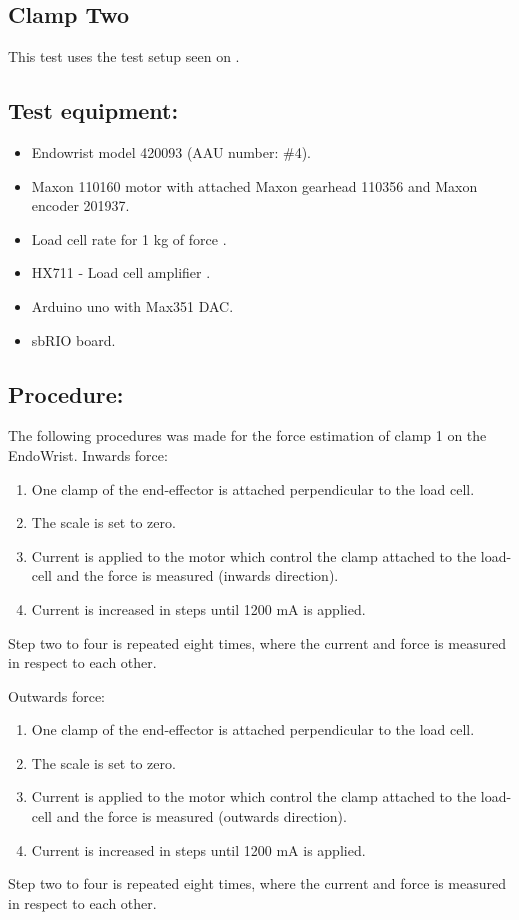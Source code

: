 \subsection{Clamp Two} %
This test uses the test setup seen on .

\subsection*{Test equipment:}
\begin{itemize}
\item Endowrist model 420093 (AAU number: \#4).
\item Maxon 110160 motor with attached Maxon gearhead 110356 and Maxon encoder 201937.
\item Load cell rate for 1 kg of force \cite{Load_cell_1kg}.
\item HX711 - Load cell amplifier \cite{HX711}.
\item Arduino uno with Max351 DAC.
\item sbRIO board.
\end{itemize}

\subsection*{Procedure:}
The following procedures was made for the force estimation of clamp 1 on the EndoWrist. 
Inwards force:
\begin{enumerate}
\item One clamp of the end-effector is attached perpendicular to the load cell. 
\item The scale is set to zero.
\item Current is applied to the motor which control the clamp attached to the load-cell and the force is measured (inwards direction).
\item Current is increased in steps until 1200 mA is applied.
\end{enumerate}
Step two to four is repeated eight times, where the current and force is measured in respect to each other. 

Outwards force:
\begin{enumerate}
\item One clamp of the end-effector is attached perpendicular to the load cell. 
\item The scale is set to zero.
\item Current is applied to the motor which control the clamp attached to the load-cell and the force is measured (outwards direction).
\item Current is increased in steps until 1200 mA is applied.
\end{enumerate}
Step two to four is repeated eight times, where the current and force is measured in respect to each other. 

